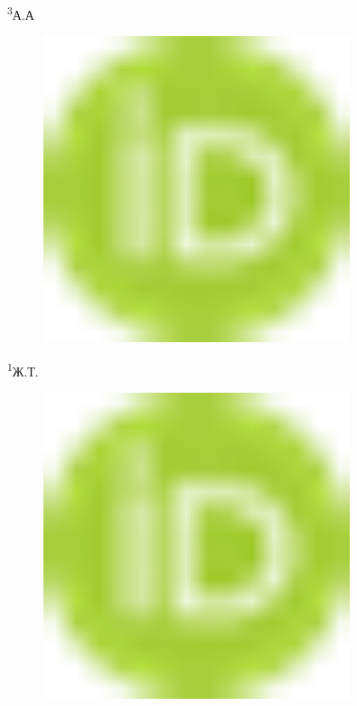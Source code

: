 {\textsuperscript{3}А.А
\begin{figure}[H]
	\centering
	\includegraphics[width=0.8\textwidth]{media/pish2/image1}
	\caption*{}
\end{figure}

\textsuperscript{1}Ж.Т.
\begin{figure}[H]
	\centering
	\includegraphics[width=0.8\textwidth]{media/pish2/image1}
	\caption*{}
\end{figure}


}
